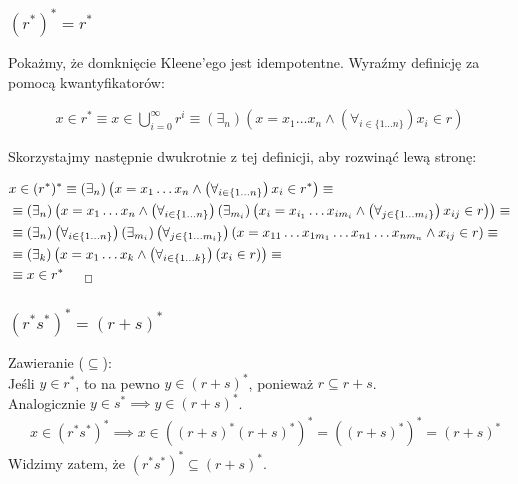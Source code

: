 \documentclass[12pt]{article}
\begin{document}
\subsubsection{$(r^{*})^{*} = r^{*}$}

Pokażmy, że domknięcie Kleene'ego jest idempotentne. Wyraźmy definicję za pomocą kwantyfikatorów:

\begin{align}
    x\in r^{*} \equiv x\in \bigcup_{i=0}^{\infty} r^i \equiv \left(\exists_n\right) 
    \left(x=x_1\dots x_n \land \left(\forall_{i\in \{1\dots n\}}\right) x_i \in r\right)
\end{align}

\noindent
Skorzystajmy następnie dwukrotnie z tej definicji, aby rozwinąć lewą stronę:

\begin{align}
    &x\in (r^{*})^{*} \equiv \left(\exists_n\right)\left(x=x_1\dots x_n \land \left(\forall_{i\in \{1\dots n\}}\right) x_i \in r^{*}\right) \equiv\\
    &\equiv \left(\exists_n\right)\left(x=x_1\dots x_n \land \left(\forall_{i\in \{1\dots n\}}\right) \left(\exists_{m_i}\right) \left(x_i = x_{i_1}\dots x_{im_i} \land \left(\forall_{j\in \{1\dots m_i\}}\right) x_{ij} \in r\right)\right) \equiv\\
    &\equiv \left(\exists_n\right)\left(\forall_{i\in \{1\dots n\}}\right)\left(\exists_{m_i}\right)\left(\forall_{j\in \{1\dots m_i\}}\right)\left(x=x_{11}\dots x_{1m_1}\dots x_{n1}\dots x_{nm_n} \land x_{ij} \in r\right) \equiv\\
    &\equiv \left(\exists_k\right)\left(x=x_1\dots x_k \land \left(\forall_{i\in \{1\dots k\}}\right)\left(x_i \in r\right)\right)\equiv \\
    &\equiv x\in r^{*}_{\qed}
\end{align}

\subsubsection{$(r^{*}s^{*})^{*} = (r+s)^{*}$}

Zawieranie ($\subseteq$):\\
\noindent
Jeśli $y\in r^{*}$, to na pewno $y\in (r+s)^{*}$, ponieważ $r \subseteq r+s$.\\ Analogicznie $y\in s^{*} \implies y\in (r+s)^{*}$.
\begin{align}
    &x\in (r^{*}s^{*})^{*} \implies x\in ((r+s)^{*}(r+s)^{*})^{*} = ((r+s)^{*})^{*} = (r+s)^{*}
\end{align}
Widzimy zatem, że $(r^{*}s^{*})^{*} \subseteq (r+s)^{*}$.\\
\end{document}
